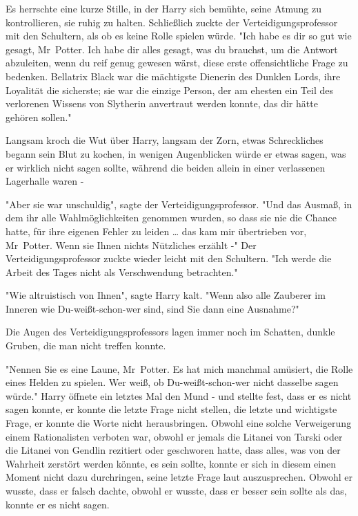 {Es herrschte eine kurze Stille, in der Harry sich bemühte, seine Atmung zu kontrollieren, sie ruhig zu halten. Schließlich zuckte der Verteidigungsprofessor mit den Schultern, als ob es keine Rolle spielen würde. "Ich habe es dir so gut wie gesagt, Mr~Potter. Ich habe dir alles gesagt, was du brauchst, um die Antwort abzuleiten, wenn du reif genug gewesen wärst, diese erste offensichtliche Frage zu bedenken. Bellatrix Black war die mächtigste Dienerin des Dunklen Lords, ihre Loyalität die sicherste; sie war die einzige Person, der am ehesten ein Teil des verlorenen Wissens von Slytherin anvertraut werden konnte, das dir hätte gehören sollen."

Langsam kroch die Wut über Harry, langsam der Zorn, etwas Schreckliches begann sein Blut zu kochen, in wenigen Augenblicken würde er etwas sagen, was er wirklich nicht sagen sollte, während die beiden allein in einer verlassenen Lagerhalle waren -

"Aber sie war unschuldig", sagte der Verteidigungsprofessor. "Und das Ausmaß, in dem ihr alle Wahlmöglichkeiten genommen wurden, so dass sie nie die Chance hatte, für ihre eigenen Fehler zu leiden … das kam mir übertrieben vor, Mr~Potter. Wenn sie Ihnen nichts Nützliches erzählt -" Der Verteidigungsprofessor zuckte wieder leicht mit den Schultern. "Ich werde die Arbeit des Tages nicht als Verschwendung betrachten."

"Wie altruistisch von Ihnen", sagte Harry kalt. "Wenn also alle Zauberer im Inneren wie Du-weißt-schon-wer sind, sind Sie dann eine Ausnahme?"

Die Augen des Verteidigungsprofessors lagen immer noch im Schatten, dunkle Gruben, die man nicht treffen konnte.

"Nennen Sie es eine Laune, Mr~Potter. Es hat mich manchmal amüsiert, die Rolle eines Helden zu spielen. Wer weiß, ob Du-weißt-schon-wer nicht dasselbe sagen würde." Harry öffnete ein letztes Mal den Mund - und stellte fest, dass er es nicht sagen konnte, er konnte die letzte Frage nicht stellen, die letzte und wichtigste Frage, er konnte die Worte nicht herausbringen. Obwohl eine solche Verweigerung einem Rationalisten verboten war, obwohl er jemals die Litanei von Tarski oder die Litanei von Gendlin rezitiert oder geschworen hatte, dass alles, was von der Wahrheit zerstört werden könnte, es sein sollte, konnte er sich in diesem einen Moment nicht dazu durchringen, seine letzte Frage laut auszusprechen. Obwohl er wusste, dass er falsch dachte, obwohl er wusste, dass er besser sein sollte als das, konnte er es nicht sagen.

}
